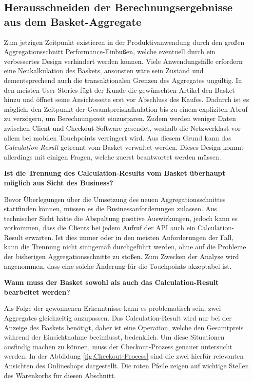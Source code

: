 \subsection{Herausschneiden der Berechnungsergebnisse aus dem Basket-Aggregate}

Zum jetzigen Zeitpunkt existieren in der Produktivanwendung durch den großen Aggregationsschnitt Performance-Einbußen, welche eventuell durch ein verbessertes Design verhindert werden können. Viele Anwendungsfälle erfordern eine Neukalkulation des Baskets, ansonsten wäre sein Zustand und dementsprechend auch die transaktionalen Grenzen des Aggregates ungültig. In den meisten User Stories fügt der Kunde die gewünschten Artikel den Basket hinzu und öffnet seine Ansichtsseite erst vor Abschluss des Kaufes. Dadurch ist es möglich, den Zeitpunkt der Gesamtpreiskalkulation bis zu einem expliziten Abruf zu verzögern, um Berechnungszeit einzusparen. Zudem werden weniger Daten zwischen Client und Checkout-Software gesendet, weshalb die Netzwerklast vor allem bei mobilen Touchpoints verringert wird. Aus diesem Grund kann das \emph{Calculation-Result} getrennt vom Basket verwaltet werden. Dieses Design kommt allerdings mit einigen Fragen, welche zuerst beantwortet werden müssen.

\textbf{Ist die Trennung des Calculation-Results vom Basket überhaupt möglich aus Sicht des Business?}

Bevor Überlegungen über die Umsetzung des neuen Aggregationsschnittes stattfinden können, müssen es die Businessanforderungen zulassen. Aus technischer Sicht hätte die Abspaltung positive Auswirkungen, jedoch kann es vorkommen, dass die Clients bei jedem Aufruf der API auch ein Calculation-Result erwarten. Ist dies immer oder in den meisten Anforderungen der Fall, kann die Trennung nicht sinngemäß durchgeführt werden, ohne auf die Probleme der bisherigen Aggregationsschnitte zu stoßen. Zum Zwecken der Analyse wird angenommen, dass eine solche Änderung für die Touchpoints akzeptabel ist.

\textbf{Wann muss der Basket sowohl als auch das Calculation-Result bearbeitet werden?}

Als Folge der gewonnenen Erkenntnisse kann es problematisch sein, zwei Aggregates gleichzeitig anzupassen. Das Calculation-Result wird nur bei der Anzeige des Baskets benötigt, daher ist eine Operation, welche den Gesamtpreis während der Einsichtnahme beeinflusst, bedenklich. Um diese Situationen ausfindig machen zu können, muss der Checkout-Prozess genauer untersucht werden. In der Abbildung \ref{fig:Checkout-Process} sind die zwei hierfür relevanten Ansichten des Onlineshops dargestellt. Die roten Pfeile zeigen auf wichtige Stellen des Warenkorbs für diesen Abschnitt.


